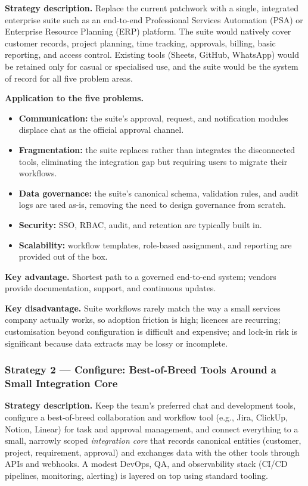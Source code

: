 \documentclass[12pt,a4paper]{report}
\begin{document}
\textbf{Strategy description.} Replace the current patchwork with a single, integrated
enterprise suite such as an end-to-end Professional Services Automation (PSA) or Enterprise
Resource Planning (ERP) platform. The suite would natively cover customer records, project
planning, time tracking, approvals, billing, basic reporting, and access control. Existing
tools (Sheets, GitHub, WhatsApp) would be retained only for casual or specialised use, and the
suite would be the system of record for all five problem areas.

\textbf{Application to the five problems.}
\begin{itemize}[leftmargin=1.6em]
    \item \textbf{Communication:} the suite's approval, request, and notification modules
          displace chat as the official approval channel.
    \item \textbf{Fragmentation:} the suite replaces rather than integrates the disconnected
          tools, eliminating the integration gap but requiring users to migrate their workflows.
    \item \textbf{Data governance:} the suite's canonical schema, validation rules, and audit
          logs are used as-is, removing the need to design governance from scratch.
    \item \textbf{Security:} SSO, RBAC, audit, and retention are typically built in.
    \item \textbf{Scalability:} workflow templates, role-based assignment, and reporting are
          provided out of the box.
\end{itemize}

\textbf{Key advantage.} Shortest path to a governed end-to-end system; vendors provide
documentation, support, and continuous updates.

\textbf{Key disadvantage.} Suite workflows rarely match the way a small services company
actually works, so adoption friction is high; licences are recurring; customisation beyond
configuration is difficult and expensive; and lock-in risk is significant because data
extracts may be lossy or incomplete.

\subsubsection{Strategy 2 --- Configure: Best-of-Breed Tools Around a Small Integration Core}
\label{sec:strategy-configure}

\textbf{Strategy description.} Keep the team's preferred chat and development tools, configure
a best-of-breed collaboration and workflow tool (e.g., Jira, ClickUp, Notion, Linear) for task
and approval management, and connect everything to a small, narrowly scoped \emph{integration
core} that records canonical entities (customer, project, requirement, approval) and exchanges
data with the other tools through APIs and webhooks. A modest DevOps, QA, and observability
stack (CI/CD pipelines, monitoring, alerting) is layered on top using standard tooling.
\end{document}
